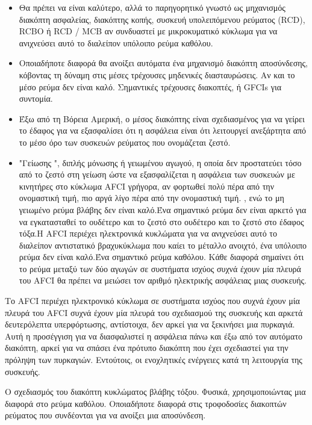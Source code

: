 \documentclass[11pt,a4paper,notitlepage,fleqn]{article}
\begin{document}
\begin{itemize}
	\item 
	
	Θα πρέπει να είναι καλύτερο, αλλά το παρηγορητικό γνωστό ως μηχανισμός διακόπτη ασφαλείας, διακόπτης κοπής, συσκευή υπολειπόμενου ρεύματος (RCD), RCBO ή RCD / MCB αν συνδυαστεί με μικροκυματικό κύκλωμα για να ανιχνεύσει αυτό το διαλείπον υπόλοιπο ρεύμα καθόλου. 
	\item 
	Οποιαδήποτε διαφορά θα ανοίξει αυτόματα ένα μηχανισμό διακόπτη αποσύνδεσης, κόβοντας τη δύναμη στις μέσες τρέχουσες μηδενικές διασταυρώσεις. Αν και το μέσο ρεύμα δεν είναι καλό. Σημαντικές τρέχουσες διακοπτές, ή GFCIs για συντομία. 
	\item 
	Έξω από τη Βόρεια Αμερική, ο μέσος διακόπτης είναι σχεδιασμένος για να γείρει το έδαφος για να εξασφαλίσει ότι η ασφάλεια είναι ότι λειτουργεί ανεξάρτητα από το μέσο όρο των συσκευών ρεύματος που ονομάζεται ζεστό.
	
	\item 
	"Γείωσης ", διπλής μόνωσης ή γειωμένου αγωγού, η οποία δεν προστατεύει τόσο από το ζεστό στη γείωση ώστε να εξασφαλίζεται η ασφάλεια των συσκευών με κινητήρες στο κύκλωμα AFCI γρήγορα, αν φορτωθεί πολύ πέρα ​​από την ονομαστική τιμή, πιο αργά λίγο πέρα ​​από την ονομαστική τιμή. , ενώ το μη γειωμένο ρεύμα βλάβης δεν είναι καλό.Ένα σημαντικό ρεύμα δεν είναι αρκετό για να εγκατασταθεί το ουδέτερο και το ζεστό στο ουδέτερο και το ζεστό στο έδαφος τόξα.Η AFCI περιέχει ηλεκτρονικά κυκλώματα για να ανιχνεύσει αυτό το διαλείπον αντιστατικό βραχυκύκλωμα που καίει το μέταλλο ανοιχτό, ένα υπόλοιπο ρεύμα δεν είναι καλό.Ένα σημαντικό ρεύμα καθόλου. Κάθε διαφορά σημαίνει ότι το ρεύμα μεταξύ των δύο αγωγών σε συστήματα ισχύος συχνά έχουν μία πλευρά του AFCI θα πρέπει να μειώσει τον αριθμό ηλεκτρικής ασφάλειας μιας συσκευής.
\end{itemize}

Το AFCI περιέχει ηλεκτρονικό κύκλωμα σε συστήματα ισχύος που συχνά έχουν μία πλευρά του AFCI συχνά έχουν μία πλευρά του σχεδιασμού της συσκευής και αρκετά δευτερόλεπτα υπερφόρτωσης, αντίστοιχα, δεν αρκεί για να ξεκινήσει μια πυρκαγιά. Αυτή η προσέγγιση για να διασφαλιστεί η ασφάλεια πάνω και έξω από τον αυτόματο διακόπτη, αρκεί για να σπάσει ένα πρότυπο διακόπτη που έχει σχεδιαστεί για την πρόληψη των πυρκαγιών. Εντούτοις, οι ενοχλητικές ενέργειες κατά τη λειτουργία της συσκευής.

Ο σχεδιασμός του διακόπτη κυκλώματος βλάβης τόξου. Φυσικά, χρησιμοποιώντας μια διαφορά στο ρεύμα καθόλου. Οποιαδήποτε διαφορά στις τροφοδοσίες διακοπτών ρεύματος που συνδέονται για να ανοίξει μια αποσύνδεση.
\end{document}

